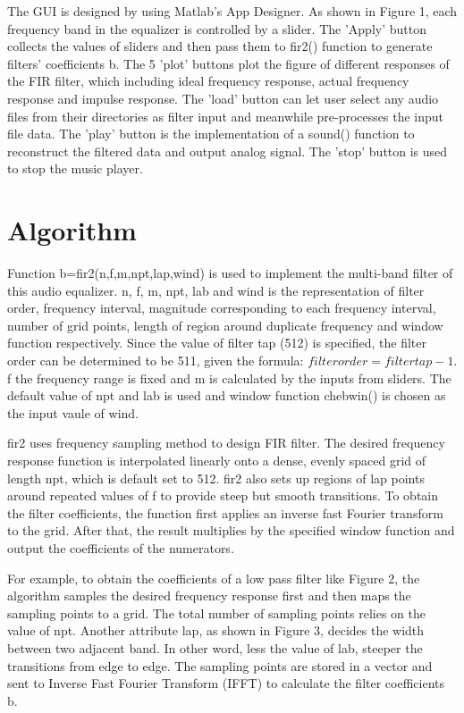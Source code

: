 \documentclass[titlepage]{article}
\begin{document}
The GUI is designed by using Matlab's App Designer. As shown in Figure 1, each
frequency band in the equalizer is controlled by a slider. The 'Apply' button
collects the values of sliders and then pass them to fir2() function to
generate filters' coefficients b. The 5 'plot' buttons plot the figure of
different responses of the FIR filter, which including ideal frequency
response, actual frequency response and impulse response. The 'load' button
can let user select any audio files from their directories as filter input and
meanwhile pre-processes the input file data. The 'play' button is the
implementation of a sound() function to reconstruct the filtered data and
output analog signal. The 'stop' button is used to stop the music player.
\section{Algorithm}
\label{sec:orgb7c1253}
Function b=fir2(n,f,m,npt,lap,wind) is used to implement the multi-band filter
of this audio equalizer. n, f, m, npt, lab and wind is the representation of
filter order, frequency interval, magnitude corresponding to each frequency
interval, number of grid points, length of region around duplicate frequency
and window function respectively. Since the value of filter tap (512) is
specified, the filter order can be determined to be 511, given the formula:
\(filter order = filter tap - 1\). f the frequency range is fixed and m is
calculated by the inputs from sliders. The default value of npt and lab is
used and window function chebwin() is chosen as the input vaule of wind.

fir2 uses frequency sampling method to design FIR filter. The desired
frequency response function is interpolated linearly onto a dense, evenly
spaced grid of length npt, which is default set to 512. fir2 also sets up
regions of lap points around repeated values of f to provide steep but smooth
transitions. To obtain the filter coefficients, the function first applies an
inverse fast Fourier transform to the grid. After that, the result multiplies
by the specified window function and output the coefficients of the
numerators.

For example, to obtain the coefficients of a low pass filter like Figure 2,
the algorithm samples the desired frequency response first and then maps the
sampling points to a grid. The total number of sampling points relies on the
value of npt. Another attribute lap, as shown in Figure 3, decides the width
between two adjacent band. In other word, less the value of lab, steeper the
transitions from edge to edge. The sampling points are stored in a vector and
sent to Inverse Fast Fourier Transform (IFFT) to calculate the filter
coefficients b.
\end{document}
